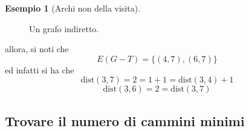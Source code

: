 \documentclass[14pt]{extreport}
\theoremstyle{definition}
\theoremstyle{definition}
\newtheorem{example}{Esempio}[subsection]
\begin{document}
\begin{example}[Archi non della visita]
\begin{figure}[H]
        \caption{Un grafo indiretto.}
    \end{figure}

    allora, si noti che $$E(G - T) = \{(4, 7), (6, 7)\}$$ ed infatti si ha che $$\mathrm{dist}(3, 7) = 2 = 1 + 1 = \mathrm{dist}(3, 4) + 1$$ $$\mathrm{dist}(3, 6) = 2 = \mathrm{dist}(3, 7)$$
\end{example}

\subsection{Trovare il numero di cammini minimi}
\end{document}
